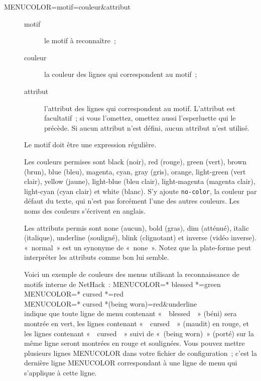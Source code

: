 \documentclass[titlepage]{article}
\begin{document}
\begin{description}
\item[{MENUCOLOR=motif=couleur\&attribut}]
\begin{description}
\item[{motif}]
le motif à reconnaître~;
\item[{couleur}]
la couleur des lignes qui correspondent au motif~;
\item[{attribut}]
l'attribut des lignes qui correspondent au motif.
L'attribut est facultatif~; si vous l'omettez, omettez aussi l'esperluette
qui le précède.
Si aucun attribut n'est défini, aucun attribut n'est utilisé.
\end{description}


Le motif doit être une expression régulière.


Les couleurs permises sont black (noir), red (rouge), green (vert), brown
(brun), blue (bleu), magenta, cyan, gray (gris), orange, light-green (vert
clair), yellow (jaune), light-blue (bleu clair), light-magenta (magenta
clair), light-cyan (cyan clair) et white (blanc).
S'y ajoute \texttt{no-color}, la couleur par défaut du texte, qui n'est pas
forcément l'une des autres couleurs.
Les noms des couleurs s'écrivent en anglais.


Les attributs permis sont none (aucun), bold (gras), dim (atténué),
italic (italique), underline (souligné), blink (clignotant) et inverse
(vidéo inverse).
«~normal~» est un synonyme de «~none~».
Notez que la plate-forme peut interpréter les attributs comme bon lui
semble.


Voici un exemple de couleurs des menus utilisant la reconnaissance de
motifs interne de NetHack~:
MENUCOLOR=\textquotedbl{}* blessed *\textquotedbl{}=green\\
MENUCOLOR=\textquotedbl{}* cursed *\textquotedbl{}=red\\
MENUCOLOR=\textquotedbl{}* cursed *(being worn)\textquotedbl{}=red\&underline\\
indique que toute ligne de menu contenant «~~blessed~~» (béni)
sera montrée en vert, les lignes contenant «~~cursed~~»
(maudit) en rouge, et les lignes contenant «~~cursed~~» suivi
de «~(being worn)~» (porté) sur la même ligne seront montrées en
rouge et soulignées.
Vous pouvez mettre plusieurs lignes MENUCOLOR dans votre fichier de
configuration~; c'est la dernière ligne MENUCOLOR correspondant à une
ligne de menu qui s'applique à cette ligne.

\end{description}
\end{document}
